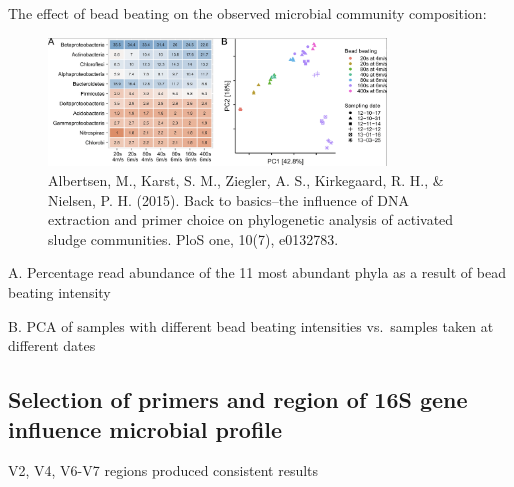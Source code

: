 \documentclass[
]{book}
\begin{document}
The effect of bead beating on the observed microbial community composition:

\begin{figure}
\centering
\includegraphics[width=0.8\textwidth,height=\textheight]{./Figures/Beads.png}
\caption{Albertsen, M., Karst, S. M., Ziegler, A. S., Kirkegaard, R. H., \& Nielsen, P. H. (2015). Back to basics--the influence of DNA extraction and primer choice on phylogenetic analysis of activated sludge communities. PloS one, 10(7), e0132783.}
\end{figure}

A. Percentage read abundance of the 11 most abundant phyla as a result of bead beating intensity

B. PCA of samples with different bead beating intensities vs.~samples taken at different dates

\hypertarget{selection-of-primers-and-region-of-16s-gene-influence-microbial-profile}{%
\subsection{Selection of primers and region of 16S gene influence microbial profile}\label{selection-of-primers-and-region-of-16s-gene-influence-microbial-profile}}

V2, V4, V6-V7 regions produced consistent results
\end{document}
